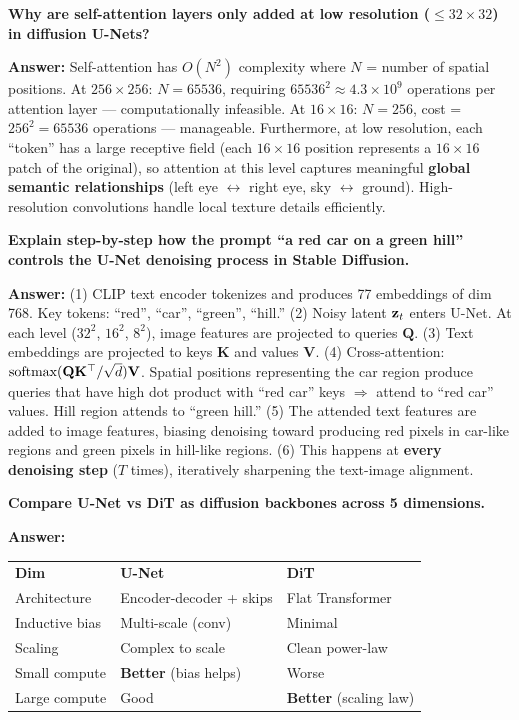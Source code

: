\begin{examq}
\textbf{Why are self-attention layers only added at low resolution ($\leq 32{\times}32$) in diffusion U-Nets?}

\textbf{Answer:} Self-attention has $O(N^2)$ complexity where $N$ = number of spatial positions. At $256{\times}256$: $N = 65536$, requiring $65536^2 \approx 4.3 \times 10^9$ operations per attention layer — computationally infeasible. At $16{\times}16$: $N = 256$, cost = $256^2 = 65536$ operations — manageable. Furthermore, at low resolution, each ``token'' has a large receptive field (each $16{\times}16$ position represents a $16{\times}16$ patch of the original), so attention at this level captures meaningful \textbf{global semantic relationships} (left eye $\leftrightarrow$ right eye, sky $\leftrightarrow$ ground). High-resolution convolutions handle local texture details efficiently.
\end{examq}

\begin{examq}
\textbf{Explain step-by-step how the prompt ``a red car on a green hill'' controls the U-Net denoising process in Stable Diffusion.}

\textbf{Answer:} (1) CLIP text encoder tokenizes and produces 77 embeddings of dim 768. Key tokens: ``red'', ``car'', ``green'', ``hill.'' (2) Noisy latent $\mathbf{z}_t$ enters U-Net. At each level ($32^2$, $16^2$, $8^2$), image features are projected to queries $\mathbf{Q}$. (3) Text embeddings are projected to keys $\mathbf{K}$ and values $\mathbf{V}$. (4) Cross-attention: $\text{softmax}(\mathbf{Q}\mathbf{K}^\top/\sqrt{d})\mathbf{V}$. Spatial positions representing the car region produce queries that have high dot product with ``red car'' keys $\Rightarrow$ attend to ``red car'' values. Hill region attends to ``green hill.'' (5) The attended text features are added to image features, biasing denoising toward producing red pixels in car-like regions and green pixels in hill-like regions. (6) This happens at \textbf{every denoising step} ($T$ times), iteratively sharpening the text-image alignment.
\end{examq}

\begin{examq}[Q3: Comparison]
\textbf{Compare U-Net vs DiT as diffusion backbones across 5 dimensions.}

\textbf{Answer:}
\begin{tabular}{lll}
\textbf{Dim} & \textbf{U-Net} & \textbf{DiT} \\
Architecture & Encoder-decoder + skips & Flat Transformer \\
Inductive bias & Multi-scale (conv) & Minimal \\
Scaling & Complex to scale & Clean power-law \\
Small compute & \textbf{Better} (bias helps) & Worse \\
Large compute & Good & \textbf{Better} (scaling law) \\
\end{tabular}
\end{examq}


